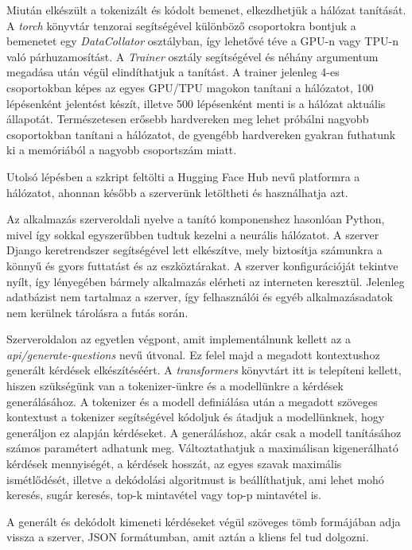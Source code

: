 Miután elkészült a tokenizált és kódolt bemenet, elkezdhetjük a hálózat tanítását. A \textit{torch} könyvtár tenzorai segítségével különböző csoportokra bontjuk a bemenetet egy \textit{DataCollator} osztályban, így lehetővé téve a GPU-n vagy TPU-n való párhuzamosítást. A \textit{Trainer} osztály segítségével és néhány argumentum megadása után végül elindíthatjuk a tanítást. A trainer jelenleg 4-es csoportokban képes az egyes GPU/TPU magokon tanítani a hálózatot, 100 lépésenként jelentést készít, illetve 500 lépésenként menti is a hálózat aktuális állapotát. Természetesen erősebb hardvereken meg lehet próbálni nagyobb csoportokban tanítani a hálózatot, de gyengébb hardvereken gyakran futhatunk ki a memóriából a nagyobb csoportszám miatt.

Utolsó lépésben a szkript feltölti a Hugging Face Hub nevű platformra a hálózatot, ahonnan később a szerverünk letöltheti és használhatja azt.


Az alkalmazás szerveroldali nyelve a tanító komponenshez hasonlóan Python, mivel így sokkal egyszerűbben tudtuk kezelni a neurális hálózatot. A szerver Django keretrendszer segítségével lett elkészítve, mely biztosítja számunkra a könnyű és gyors futtatást és az eszköztárakat. A szerver konfigurációját tekintve nyílt, így lényegében bármely alkalmazás elérheti az interneten keresztül. Jelenleg adatbázist nem tartalmaz a szerver, így felhasználói és egyéb alkalmazásadatok nem kerülnek tárolásra a futás során.

Szerveroldalon az egyetlen végpont, amit implementálnunk kellett az a \\
\textit{api/generate-questions} nevű útvonal. Ez felel majd a megadott kontextushoz generált kérdések elkészítéséért. A \textit{transformers} könyvtárt itt is telepíteni kellett, hiszen szükségünk van a tokenizer-ünkre és a modellünkre a kérdések generálásához. A tokenizer és a modell definiálása után a megadott szöveges kontextust a tokenizer segítségével kódoljuk és átadjuk a modellünknek, hogy generáljon ez alapján kérdéseket. A generáláshoz, akár csak a modell tanításához számos paramétert adhatunk meg. Változtathatjuk a maximálisan kigenerálható kérdések mennyiségét, a kérdések hosszát, az egyes szavak maximális ismétlődését, illetve a dekódolási algoritmust is beállíthatjuk, ami lehet mohó keresés, sugár keresés, top-k mintavétel vagy top-p mintavétel is.

A generált és dekódolt kimeneti kérdéseket végül szöveges tömb formájában adja vissza a szerver, JSON formátumban, amit aztán a kliens fel tud dolgozni.

